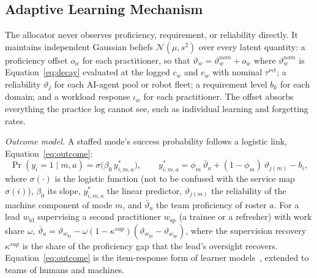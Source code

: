 \documentclass[utf8]{FrontiersinHarvard}
\begin{document}
	\subsection{Adaptive Learning Mechanism}
	\label{sec:learning}

	The allocator never observes proficiency, requirement, or reliability directly. It maintains independent Gaussian beliefs $\mathcal{N}(\mu,s^2)$ over every latent quantity: a proficiency offset $o_w$ for each practitioner, so that $\vartheta_w = \vartheta^{nom}_w + o_w$ where $\vartheta^{nom}_w$ is Equation~\eqref{eq:decay} evaluated at the logged $c_w$ and $e_w$ with nominal $\tau^{ret}$; a reliability $\vartheta_j$ for each AI-agent pool or robot fleet; a requirement level $b_k$ for each domain; and a workload response $\iota_w$ for each practitioner. The offset absorbs everything the practice log cannot see, such as individual learning and forgetting rates.

	\textit{Outcome model.} A staffed mode's success probability follows a logistic link, Equation~\eqref{eq:outcome}:
	\begin{equation}
		\Pr(y_i=1\mid m,a) = \sigma\bigl(\beta_0\,y^{\ast}_{i,m,a}\bigr),\qquad
		y^{\ast}_{i,m,a} = \phi_m\,\bar\vartheta_a + (1-\phi_m)\,\vartheta_{j(m)} - b_i ,
		\label{eq:outcome}
	\end{equation}
	where $\sigma(\cdot)$ is the logistic function (not to be confused with the service map $\sigma(i)$), $\beta_0$ its slope, $y^{\ast}_{i,m,a}$ the linear predictor, $\vartheta_{j(m)}$ the reliability of the machine component of mode $m$, and $\bar\vartheta_a$ the team proficiency of roster $a$. For a lead $w_{\mathrm{ld}}$ supervising a second practitioner $w_{\mathrm{sp}}$ (a trainee or a refresher) with work share $\omega$, $\bar\vartheta_a = \vartheta_{w_{\mathrm{ld}}} - \omega(1-\kappa^{sup})(\vartheta_{w_{\mathrm{ld}}}-\vartheta_{w_{\mathrm{sp}}})$, where the supervision recovery $\kappa^{sup}$ is the share of the proficiency gap that the lead's oversight recovers. Equation~\eqref{eq:outcome} is the item-response form of learner models~\citep{Pelanek2017}, extended to teams of humans and machines.
\end{document}
